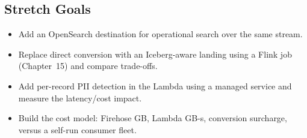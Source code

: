 \subsection*{Stretch Goals}
\begin{itemize}
    \item Add an OpenSearch destination for operational search over the same stream.
    \item Replace direct conversion with an Iceberg-aware landing using a Flink job (Chapter~15) and compare trade-offs.
    \item Add per-record PII detection in the Lambda using a managed service and measure the latency/cost impact.
    \item Build the cost model: Firehose GB, Lambda GB-s, conversion surcharge, versus a self-run consumer fleet.
\end{itemize}
